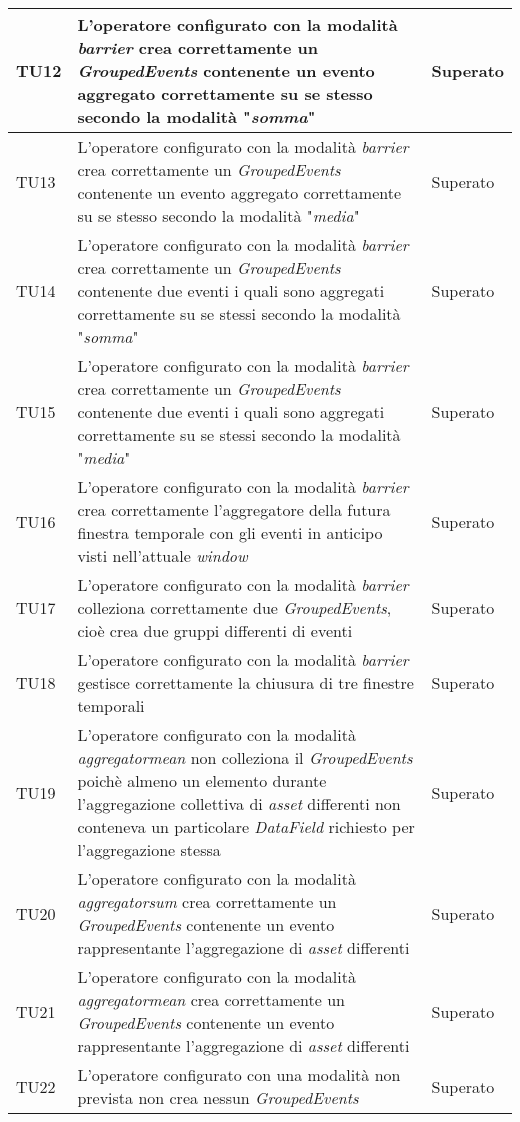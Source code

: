 {\begin{longtable}{L{3cm} L{8.5cm} L{2cm}}
\hline
TU12 & L'operatore configurato con la modalità \textit{barrier} crea correttamente un \textit{GroupedEvents} contenente un evento aggregato correttamente su se stesso secondo la modalità "\textit{somma}" & Superato \\
\hline
TU13 & L'operatore configurato con la modalità \textit{barrier} crea correttamente un \textit{GroupedEvents} contenente un evento aggregato correttamente su se stesso secondo la modalità "\textit{media}" & Superato \\
\hline
TU14 & L'operatore configurato con la modalità \textit{barrier} crea correttamente un \textit{GroupedEvents} contenente due eventi i quali sono aggregati correttamente su se stessi secondo la modalità "\textit{somma}" & Superato \\
\hline
TU15 & L'operatore configurato con la modalità \textit{barrier} crea correttamente un \textit{GroupedEvents} contenente due eventi i quali sono aggregati correttamente su se stessi secondo la modalità "\textit{media}" & Superato \\
\hline
TU16 & L'operatore configurato con la modalità \textit{barrier} crea correttamente l'aggregatore della futura finestra temporale con gli eventi in anticipo visti nell'attuale \textit{window} & Superato \\
\hline
TU17 & L'operatore configurato con la modalità \textit{barrier} colleziona correttamente due \textit{GroupedEvents}, cioè crea due gruppi differenti di eventi & Superato \\
\hline
TU18 & L'operatore configurato con la modalità \textit{barrier} gestisce correttamente la chiusura di tre finestre temporali & Superato \\
\hline
TU19 & L'operatore configurato con la modalità \textit{aggregatormean} non colleziona il \textit{GroupedEvents} poichè almeno un elemento durante l'aggregazione collettiva di \textit{asset} differenti non conteneva un particolare \textit{DataField} richiesto per l'aggregazione stessa & Superato \\
\hline
TU20 & L'operatore configurato con la modalità \textit{aggregatorsum} crea correttamente un \textit{GroupedEvents} contenente un evento rappresentante l'aggregazione di \textit{asset} differenti & Superato \\
\hline
TU21 & L'operatore configurato con la modalità \textit{aggregatormean} crea correttamente un \textit{GroupedEvents} contenente un evento rappresentante l'aggregazione di \textit{asset} differenti & Superato \\
\hline
TU22 & L'operatore configurato con una modalità non prevista non crea nessun \textit{GroupedEvents} & Superato \\
\hline
\end{longtable}
}



